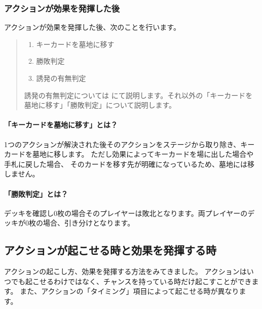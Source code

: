 \documentclass[letterpaper,10pt,dvipdfmx]{sphinxmanual}
\begin{document}
\subsubsection{アクションが効果を発揮した後}
\label{\detokenize{common/03-action:id15}}
アクションが効果を発揮した後、次のことを行います。
\begin{quote}
\begin{enumerate}
%
\item {} 
キーカードを墓地に移す

\item {} 
勝敗判定

\item {} 
誘発の有無判定

\end{enumerate}

誘発の有無判定については {\hyperref[\detokenize{common/05-action_detail::doc}]{}} にて説明します。それ以外の「キーカードを墓地に移す」「勝敗判定」について説明します。
\end{quote}


\paragraph{「キーカードを墓地に移す」とは？}
\label{\detokenize{common/03-action:keycard-gy}}\label{\detokenize{common/03-action:id16}}
1つのアクションが解決された後そのアクションをステージから取り除き、キーカードを墓地に移します。
ただし効果によってキーカードを場に出した場合や手札に戻した場合、
そのカードを移す先が明確になっているため、墓地には移しません。


\paragraph{「勝敗判定」とは？}
\label{\detokenize{common/03-action:id17}}
デッキを確認し0枚の場合そのプレイヤーは敗北となります。両プレイヤーのデッキが0枚の場合、引き分けとなります。


\subsection{アクションが起こせる時と効果を発揮する時}
\label{\detokenize{common/03-action:action-chance}}\label{\detokenize{common/03-action:id18}}
アクションの起こし方、効果を発揮する方法をみてきました。
アクションはいつでも起こせるわけではなく、チャンスを持っている時だけ起こすことができます。
また、アクションの「タイミング」項目によって起こせる時が異なります。
\end{document}
